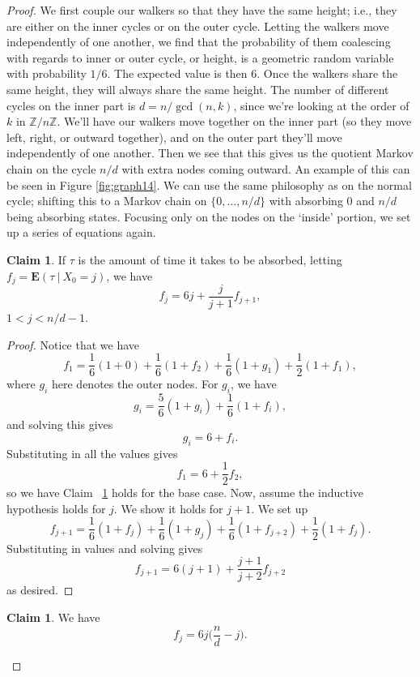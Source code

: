 \documentclass[10pt,a4paper]{amsart}
\theoremstyle{definition}
\numberwithin{definition}{section}
\newtheorem{claim}[definition]{Claim}
\begin{document}
\begin{proof}

We first couple our walkers so that they have the same height; i.e., they are either on the inner cycles or on the outer cycle. Letting the walkers move independently of one another, we find that the probability of them coalescing with regards to inner or outer cycle, or height, is a geometric random variable with probability $1/6$. The expected value is then $6$. Once the walkers share the same height, they will always share the same height. The number of different cycles on the inner part is $d = n/\gcd (n,k)$, since we're looking at the order of $k$ in $\mathbb{Z}/n\mathbb{Z}$. We'll have our walkers move together on the inner part (so they move left, right, or outward together), and on the outer part they'll move independently of one another. Then we see that this gives us the quotient Markov chain on the cycle $n/d$ with extra nodes coming outward. An example of this can be seen in Figure \ref{fig:graph14}. We can use the same philosophy as on the normal cycle; shifting this to a Markov chain on $\{0, \ldots, n/d\}$ with absorbing $0$ and $n/d$ being absorbing states. Focusing only on the nodes on the `inside' portion, we set up a series of equations again.
\begin{claim}\label{claim:naya}
If $\tau$ is the amount of time it takes to be absorbed, letting $f_j = \mathbf{E}(\tau \ | \ X_0 = j)$, we have
\[ f_j = 6j + \frac{j}{j+1}f_{j+1},\]
$1 < j < n/d-1$.
\end{claim}

\begin{proof}
Notice that we have 
\[f_1 = \frac{1}{6}(1 + 0) + \frac{1}{6}(1+f_2) + \frac{1}{6}(1+g_1) + \frac{1}{2}(1+f_1), \]
where $g_i$ here denotes the outer nodes. For $g_i$, we have 
\[g_i = \frac{5}{6}(1+g_i) + \frac{1}{6}(1+f_i), \]
and solving this gives
\[g_i = 6 + f_i. \]
Substituting in all the values gives
\[f_1 = 6 + \frac{1}{2}f_2, \]
so we have Claim ~\ref{claim:naya} holds for the base case. Now, assume the inductive hypothesis holds for $j$. We show it holds for $j+1$. We set up 
\[f_{j+1} = \frac{1}{6}(1+f_j) + \frac{1}{6}(1+g_j) + \frac{1}{6}(1+f_{j+2}) + \frac{1}{2}(1+f_j). \]
Substituting in values and solving gives
\[f_{j+1} = 6(j+1) + \frac{j+1}{j+2}f_{j+2} \]
as desired.
\end{proof}

\begin{claim}\label{claim:grixis}
We have
\[f_j = 6j\bigg(\frac{n}{d}-j\bigg).\]
\end{claim}


\end{proof}
\end{document}
